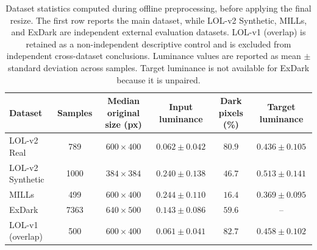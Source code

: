 \begin{table}[t]
	\centering
	\caption{Dataset statistics computed during offline preprocessing, before applying the final resize. The first row reports the main dataset, while LOL-v2 Synthetic, MILLs, and ExDark are independent external evaluation datasets. LOL-v1 (overlap) is retained as a non-independent descriptive control and is excluded from independent cross-dataset conclusions. Luminance values are reported as mean $\pm$ standard deviation across samples. Target luminance is not available for ExDark because it is unpaired.}
	\label{tab:dataset_statistics}
	\begin{tabular}{lccccc}
		\toprule
		Dataset & Samples & Median original size (px) & Input luminance & Dark pixels (\%) & Target luminance \\
		\midrule
		LOL-v2 Real & 789 & $600 \times 400$ & $0.062 \pm 0.042$ & $80.9$ & $0.436 \pm 0.105$ \\
		\midrule
		LOL-v2 Synthetic & 1000 & $384 \times 384$ & $0.240 \pm 0.138$ & $46.7$ & $0.513 \pm 0.141$ \\
		MILLs & 499 & $600 \times 400$ & $0.244 \pm 0.110$ & $16.4$ & $0.369 \pm 0.095$ \\
		ExDark & 7363 & $640 \times 500$ & $0.143 \pm 0.086$ & $59.6$ & -- \\
		\midrule
		LOL-v1 (overlap) & 500 & $600 \times 400$ & $0.061 \pm 0.041$ & $82.7$ & $0.458 \pm 0.102$ \\
		\bottomrule
	\end{tabular}
\end{table}